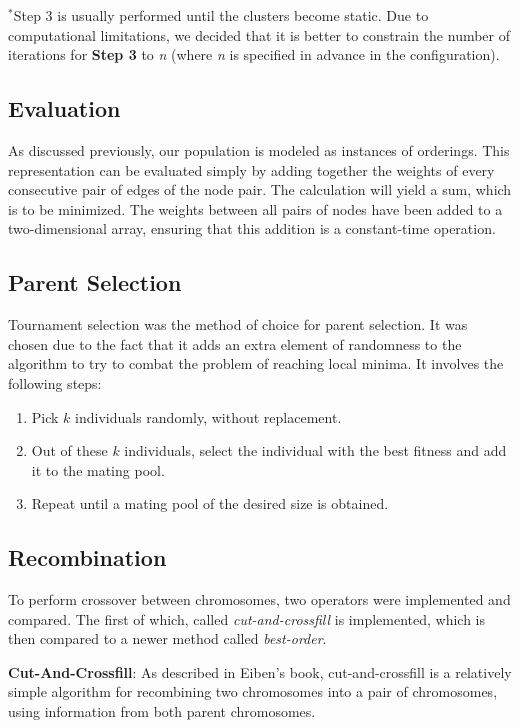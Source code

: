 \documentclass[12pt,twocolumn,oneside]{osajnl}
\begin{document}
$^{*}$Step 3 is usually performed until the clusters become static. Due to computational limitations, we decided that it is better to constrain the number of iterations for \textbf{Step 3} to \textit{n} (where \textit{n} is specified in advance in the configuration).

\subsection{Evaluation}
As discussed previously, our population is modeled as instances of orderings. This representation can be evaluated simply by adding together the weights of every consecutive pair of edges of the node pair. The calculation will yield a sum, which is to be minimized. The weights between all pairs of nodes have been added to a two-dimensional array, ensuring that this addition is a constant-time operation.

\subsection{Parent Selection}
Tournament selection was the method of choice for parent selection. It was chosen due to the fact that it adds an extra element of randomness to the algorithm to try to combat the problem of reaching local minima. It involves the following steps:

\begin{enumerate}
    \item Pick $k$ individuals randomly, without replacement.
    \item Out of these $k$ individuals, select the individual with the best fitness and add it to the mating pool.
    \item Repeat until a mating pool of the desired size is obtained.
\end{enumerate}

\subsection{Recombination}
To perform crossover between chromosomes, two operators were implemented and compared. The first of which, called \textit{cut-and-crossfill} is implemented, which is then compared to a newer method called \textit{best-order}.

\textbf{Cut-And-Crossfill}: As described in Eiben's book, cut-and-crossfill is a relatively simple algorithm for recombining two chromosomes into a pair of chromosomes, using information from both parent chromosomes\cite{eiben2008introduction}.
\end{document}
